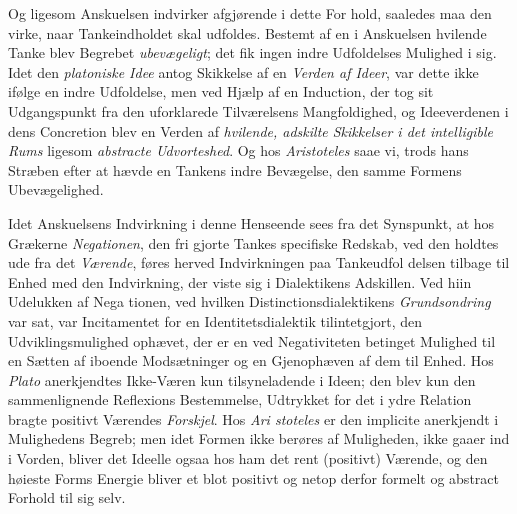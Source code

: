 Og ligesom Anskuelsen indvirker afgjørende i dette For\-%
hold, saaledes maa den virke, naar Tankeindholdet skal udfoldes.
Bestemt af en i Anskuelsen hvilende Tanke blev Begrebet
\emph{ubevægeligt}; det fik ingen indre Udfoldelses Mulighed i sig.
Idet den \emph{platoniske Idee} antog Skikkelse af en \emph{Verden af
Ideer}, var dette ikke ifølge en indre Udfoldelse, men ved
Hjælp af en Induction, der tog sit Udgangspunkt fra den
uforklarede Tilværelsens Mangfoldighed, og Ideeverdenen i
dens Concretion blev en Verden af \emph{hvilende, adskilte
Skikkelser i det intelligible Rums} ligesom \emph{abstracte
Udvorteshed}. Og hos \emph{Aristoteles} saae vi, trods hans
Stræben efter at hævde en Tankens indre Bevægelse, den
samme Formens Ubevægelighed.

Idet Anskuelsens Indvirkning i denne Henseende sees
fra det Synspunkt, at hos Grækerne \emph{Negationen}, den fri\-%
gjorte Tankes specifiske Redskab, ved den holdtes ude fra det
\emph{Værende}, føres herved Indvirkningen paa Tankeudfol\-%
delsen tilbage til Enhed med den Indvirkning, der viste
sig i Dialektikens Adskillen. Ved hiin Udelukken af Nega\-%
tionen, ved hvilken Distinctionsdialektikens \emph{Grundsondring}
var sat, var Incitamentet for en Identitetsdialektik tilintetgjort,
den Udviklingsmulighed ophævet, der er en ved Negativiteten
betinget Mulighed til en Sætten af iboende Modsætninger og
en Gjenophæven af dem til Enhed. Hos \emph{Plato} anerkjendtes
Ikke-Væren kun tilsyneladende i Ideen; den blev kun den
sammenlignende Reflexions Bestemmelse, Udtrykket for det i
ydre Relation bragte positivt Værendes \emph{Forskjel}. Hos \emph{Ari\-%
stoteles} er den implicite anerkjendt i Mulighedens Begreb;
men idet Formen ikke berøres af Muligheden, ikke gaaer ind
i Vorden, bliver det Ideelle ogsaa hos ham det rent (positivt)
Værende, og den høieste Forms Energie bliver et blot positivt
og netop derfor formelt og abstract Forhold til sig selv.

